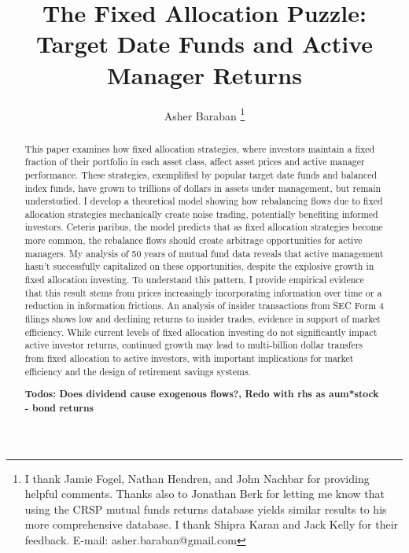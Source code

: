 \documentclass[12pt]{article}
\title{The Fixed Allocation Puzzle: Target Date Funds and Active Manager Returns}
\author{Asher Baraban \footnote{I thank Jamie Fogel, Nathan Hendren, and John Nachbar for providing helpful comments. Thanks also to Jonathan Berk for letting me know that using the CRSP mutual funds returns database yields similar results to his more comprehensive database. I thank Shipra Karan and Jack Kelly for their feedback. E-mail: asher.baraban@gmail.com}}
\begin{document}
\maketitle

\begin{abstract}
This paper examines how fixed allocation strategies, where investors maintain a fixed fraction of their portfolio in each asset class, affect asset prices and active manager performance. These strategies, exemplified by popular target date funds and balanced index funds, have grown to trillions of dollars in assets under management, but remain understudied. I develop a theoretical model showing how rebalancing flows due to fixed allocation strategies mechanically create noise trading, potentially benefiting informed investors. Ceteris paribus, the model predicts that as fixed allocation strategies become more common, the rebalance flows should create arbitrage opportunities for active managers. My analysis of 50 years of mutual fund data reveals that active management hasn't successfully capitalized on these opportunities, despite the explosive growth in fixed allocation investing. To understand this pattern, I provide empirical evidence that this result stems from prices increasingly incorporating information over time or a reduction in information frictions. An analysis of insider transactions from SEC Form 4 filings shows low and declining returns to insider trades, evidence in support of market efficiency. While current levels of fixed allocation investing do not significantly impact active investor returns, continued growth may lead to multi-billion dollar transfers from fixed allocation to active investors, with important implications for market efficiency and the design of retirement savings systems.

\textbf{Todos: Does dividend cause exogenous flows?, Redo with rhs as aum*stock - bond returns}


\end{abstract}
\end{document}
